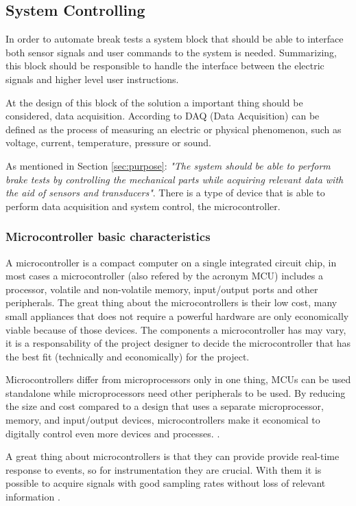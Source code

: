 \subsection{System Controlling}\label{ssec:mcu-review}
	In order to automate break tests a system block that should be able to interface both sensor signals and user commands to the system is needed. Summarizing, this block should be responsible to handle the interface between the electric signals and higher level user instructions.
	\par
	At the design of this block of the solution a important thing should be considered, data acquisition. According to \cite{ni-daq} DAQ (Data Acquisition) can be defined as the process of measuring an electric or physical phenomenon, such as voltage, current, temperature, pressure or sound.
	\par
	As mentioned in Section \ref{sec:purpose}: \textit{"The system should be able to perform brake tests by controlling the mechanical parts while acquiring relevant data with the aid of sensors and transducers"}. There is a type of device that is able to perform data acquisition and system control, the microcontroller.

	\subsubsection{Microcontroller basic characteristics}\label{sssec:microcontroller-basic-characteristics}

		A microcontroller is a compact computer on a single integrated circuit chip, in most cases a microcontroller (also refered by the acronym MCU) includes a processor, volatile and non-volatile memory, input/output ports and other peripherals. The great thing about the microcontrollers is their low cost, many small appliances that does not require a powerful hardware are only economically viable because of those devices. The components a microcontroller has may vary, it is a responsability of the project designer to decide the microcontroller that has the best fit (technically and economically) for the project.
		\par
		Microcontrollers differ from microprocessors only in one thing, MCUs can be used standalone while microprocessors need other peripherals to be used. By reducing the size and cost compared to a design that uses a separate microprocessor, memory, and input/output devices, microcontrollers make it economical to digitally control even more devices and processes. \cite{mcuDef}.
		\par
		A great thing about microcontrollers is that they can provide provide real-time response to events, so for instrumentation they are crucial. With them it is possible to acquire signals with good sampling rates without loss of relevant information \cite{bartz2004data}.

